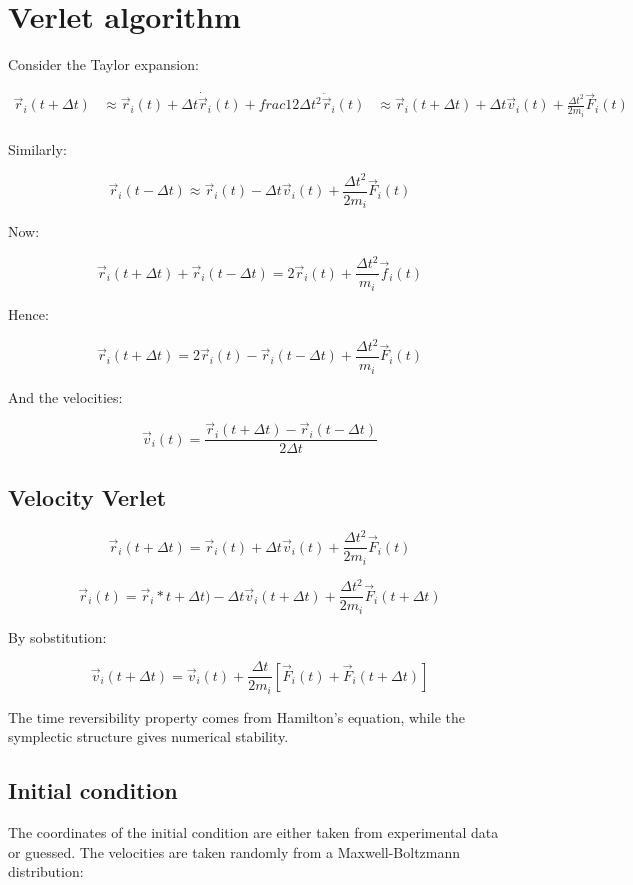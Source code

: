 \section{Verlet algorithm}
Consider the Taylor expansion:

\begin{align*}
	\vec{r}_i(t+\Delta t)&\approx \vec{r}_i(t) + \Delta t\dot{\vec{r}}_i(t) + frac{1}{2}\Delta t^2\ddot{\vec{r}}_i(t)
											 &\approx\vec{r}_i(t+\Delta t)+\Delta t\vec{v}_i(t)+\frac{\Delta t^2}{2m_i}\vec{F}_i(t) \\
\end{align*}

Similarly:

$$\vec{r}_i(t-\Delta t) \approx\vec{r}_i(t)-\Delta t\vec{v}_i(t)+\frac{\Delta t^2}{2m_i}\vec{F}_i(t)$$

Now:

$$\vec{r}_i(t+\Delta t) + \vec{r}_i(t-\Delta t) = 2\vec{r}_i(t) + \frac{\Delta t^2}{m_i}\vec{f}_i(t)$$

Hence:

$$\vec{r}_i(t+\Delta t) = 2\vec{r}_i(t) - \vec{r}_i(t-\Delta t) + \frac{\Delta t^2}{m_i}\vec{F}_i(t)$$

And the velocities:

$$\vec{v}_i(t) = \frac{\vec{r}_i(t+\Delta t)-\vec{r}_i(t-\Delta t)}{2\Delta t}$$


	\subsection{Velocity Verlet}

	$$\vec{r}_i(t+\Delta t) = \vec{r}_i(t) + \Delta t\vec{v}_i(t) + \frac{\Delta t^2}{2m_i}\vec{F}_i(t)$$

	$$\vec{r}_i(t) = \vec{r}_i*t+\Delta t) -\Delta t\vec{v}_i(t + \Delta t) + \frac{\Delta t^2}{2m_i}\vec{F}_i(t+\Delta t)$$

	By sobstitution:

	$$\vec{v}_i(t+\Delta t) = \vec{v}_i(t) + \frac{\Delta t}{2m_i}[\vec{F}_i(t) + \vec{F}_i(t+\Delta t)]$$

	The time reversibility property comes from Hamilton's equation, while the symplectic structure gives numerical stability.

	\subsection{Initial condition}
	The coordinates of the initial condition are either taken from experimental data or guessed.
	The velocities are taken randomly from a Maxwell-Boltzmann distribution:


